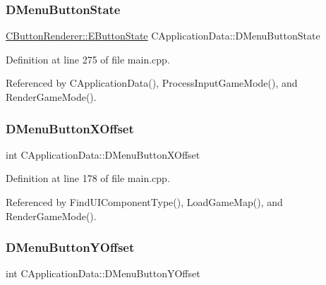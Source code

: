 \subsubsection{\texorpdfstring{D\+Menu\+Button\+State}{DMenuButtonState}}
{\footnotesize\ttfamily \hyperlink{classCButtonRenderer_ae0eccda184600f6e14bfd59033e5e9a1}{C\+Button\+Renderer\+::\+E\+Button\+State} C\+Application\+Data\+::\+D\+Menu\+Button\+State\hspace{0.3cm}{\ttfamily [protected]}}



Definition at line 275 of file main.\+cpp.



Referenced by C\+Application\+Data(), Process\+Input\+Game\+Mode(), and Render\+Game\+Mode().

\hypertarget{classCApplicationData_a04283b17a8c04af8325de4304a848095}{}\label{classCApplicationData_a04283b17a8c04af8325de4304a848095} 
\subsubsection{\texorpdfstring{D\+Menu\+Button\+X\+Offset}{DMenuButtonXOffset}}
{\footnotesize\ttfamily int C\+Application\+Data\+::\+D\+Menu\+Button\+X\+Offset\hspace{0.3cm}{\ttfamily [protected]}}



Definition at line 178 of file main.\+cpp.



Referenced by Find\+U\+I\+Component\+Type(), Load\+Game\+Map(), and Render\+Game\+Mode().

\hypertarget{classCApplicationData_a63012360d0a98eef89707a503f4379a8}{}\label{classCApplicationData_a63012360d0a98eef89707a503f4379a8} 
\subsubsection{\texorpdfstring{D\+Menu\+Button\+Y\+Offset}{DMenuButtonYOffset}}
{\footnotesize\ttfamily int C\+Application\+Data\+::\+D\+Menu\+Button\+Y\+Offset\hspace{0.3cm}{\ttfamily [protected]}}



